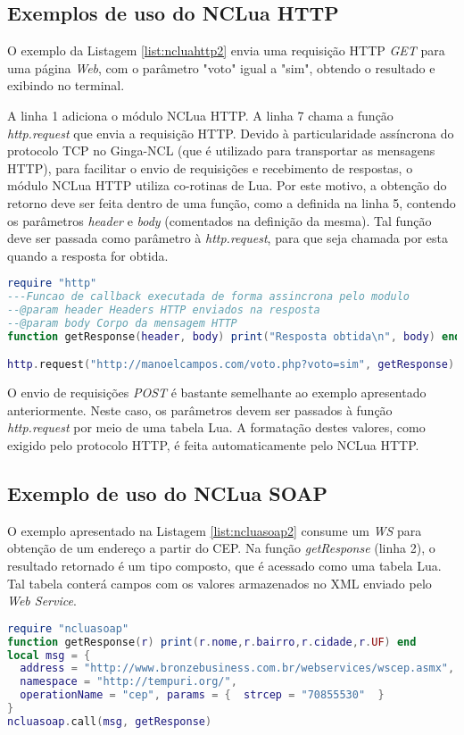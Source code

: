 \subsection{Exemplos de uso do NCLua HTTP}

O exemplo da Listagem \ref{list:ncluahttp2} envia uma requisição HTTP \textit{GET} para uma página
\textit{Web}, com o parâmetro "voto" igual a "sim", obtendo o resultado e exibindo no terminal. 

A linha 1 adiciona o módulo NCLua HTTP. 
A linha 7 chama a função \textit{http.request}
que envia a requisição HTTP. Devido à particularidade assíncrona
do protocolo TCP no Ginga-NCL (que é utilizado para transportar as mensagens HTTP), 
para facilitar o envio de requisições e recebimento de respostas,
o módulo NCLua HTTP utiliza co-rotinas de Lua. 
Por este motivo, a obtenção do retorno deve ser feita dentro de uma função, como
a definida na linha 5, contendo os parâmetros \textit{header} e \textit{body} (comentados na definição
da mesma). Tal função deve ser passada como parâmetro à \textit{http.request}, para que seja
chamada por esta quando a resposta for obtida. 

\begin{lstlisting}[caption=Exemplo de envio de requisição GET com NCLua HTTP, label=list:ncluahttp2, language=lua]
require "http"
---Funcao de callback executada de forma assincrona pelo modulo
--@param header Headers HTTP enviados na resposta
--@param body Corpo da mensagem HTTP
function getResponse(header, body) print("Resposta obtida\n", body) end

http.request("http://manoelcampos.com/voto.php?voto=sim", getResponse)
\end{lstlisting}

O envio de requisições \textit{POST} é bastante semelhante ao exemplo apresentado anteriormente. 
Neste caso, os parâmetros devem ser passados à função \textit{http.request} por meio
de uma tabela Lua. A formatação destes valores, como exigido pelo protocolo HTTP, é feita automaticamente pelo NCLua HTTP.

\subsection{Exemplo de uso do NCLua SOAP} \label{sec:apps-ncluasoap}

O exemplo apresentado na Listagem \ref{list:ncluasoap2} consume um \textit{WS} para obtenção de um endereço a partir do CEP. 
Na função \textit{getResponse} (linha 2), o resultado retornado é um tipo composto, que é acessado como uma tabela Lua.
Tal tabela conterá campos com os valores armazenados no XML enviado pelo \textit{Web Service}.

\begin{lstlisting}[caption=Exemplo de consumo de WS de consulta de endereço a partir do CEP, label=list:ncluasoap2, language=lua]
require "ncluasoap"
function getResponse(r) print(r.nome,r.bairro,r.cidade,r.UF) end
local msg = {
  address = "http://www.bronzebusiness.com.br/webservices/wscep.asmx",
  namespace = "http://tempuri.org/",
  operationName = "cep", params = {  strcep = "70855530"  }  
}
ncluasoap.call(msg, getResponse)
\end{lstlisting}

